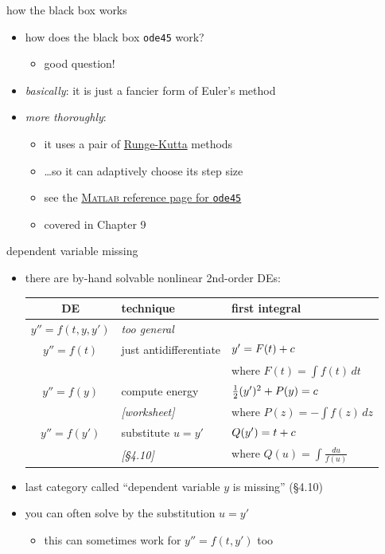 \documentclass[dvipsnames,colorlinks]{beamer}
\newcommand{\Matlab}{\textsc{Matlab}\xspace}
\begin{document}
\begin{frame}{how the black box works}

\begin{itemize}
\item how does the black box \alert{\texttt{ode45}} work?
    \begin{itemize}
    \item good question!
    \end{itemize}
\item \emph{basically}:  it is just a fancier form of Euler's method
\item \emph{more thoroughly}:
    \begin{itemize}
    \item it uses a pair of \href{https://en.wikipedia.org/wiki/Runge_Kutta_methods}{Runge-Kutta} methods
    \item \dots so it can adaptively choose its step size
    \item see the \href{https://www.mathworks.com/help/matlab/ref/ode45.html}{\Matlab reference page for \texttt{ode45}}
    \item covered in Chapter 9
    \end{itemize}
\end{itemize}
\end{frame}


\begin{frame}{dependent variable missing}

\begin{itemize}
\item there are by-hand solvable nonlinear 2nd-order DEs:

\bigskip
\small
\begin{tabular}{c|l|l}
DE & technique & first integral \\ \hline \hline
$y'' = f(t,y,y')$ & \emph{too general} &  \\ \hline
$y'' = f(t)$ & just antidifferentiate & $y' = F(t)+c \large\strut$ \\
& & where $F(t) = \int f(t)\,dt$ \\ \hline
$y'' = f(y)$ & compute energy & $\frac{1}{2} (y')^2 + P(y) = c \large\strut$\\
& \emph{[worksheet]} & where $P(z) = -\int f(z)\,dz$ \\ \hline
$y'' = f(y')$ & substitute $u=y'$ & $Q(y') = t + c \large\strut$\\
& \emph{[\S4.10]} & where $Q(u)=\int \frac{du}{f(u)}$
\end{tabular}

\normalsize

\bigskip
\item last category called ``dependent variable $y$ is missing'' (\S4.10)
\item you can often solve by the substitution $u=y'$
    \begin{itemize}
    \item this can sometimes work for $y'' = f(t,y')$ too
    \end{itemize}
\end{itemize}
\end{frame}
\end{document}

